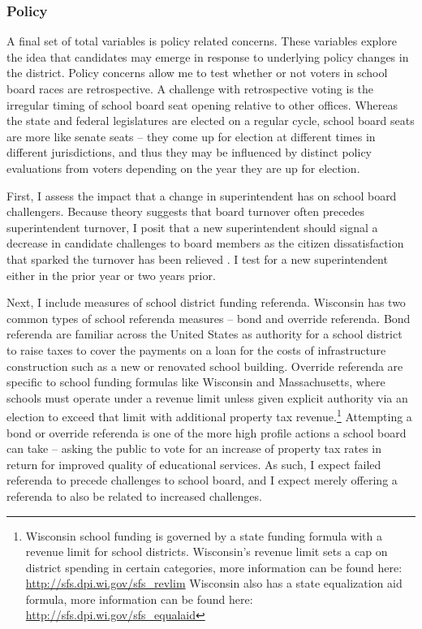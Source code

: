 \subsubsection{Policy}
A final set of total variables is policy related concerns. These variables 
explore the idea that candidates may emerge in response to underlying 
policy changes in the district. Policy concerns allow me to test whether or not 
voters in school board races are retrospective. A challenge with retrospective 
voting is the irregular timing of school board seat opening relative to other 
offices. Whereas the state and federal legislatures are elected on a regular cycle, 
school board seats are more like senate seats -- they come up for election at 
different times in different jurisdictions, and thus they may be influenced by 
distinct policy evaluations from voters depending on the year they are up for election. 

First, I assess the impact that a change in superintendent has on school board 
challengers. Because theory suggests that board turnover often precedes 
superintendent turnover, I posit that a new superintendent should signal a 
decrease in candidate challenges to board members as the citizen dissatisfaction 
that sparked the turnover has been relieved \cite{RefWorks:336, RefWorks:340}. 
I test for a new superintendent either in the prior year or two years prior. 

Next, I include measures of school district funding referenda. Wisconsin has 
two common types of school referenda measures -- bond and override referenda. 
Bond referenda are familiar across the United States as authority for a school 
district to raise taxes to cover the payments on a loan for the costs of infrastructure 
construction such as a new or renovated school building. Override referenda are specific 
to school funding formulas like Wisconsin and Massachusetts, where schools must 
operate under a revenue limit unless given explicit authority via an 
election to exceed that limit with additional property tax revenue.\footnote{Wisconsin 
school funding is governed by a state funding formula with a revenue limit for 
school districts. Wisconsin's revenue limit sets a cap on district spending in 
certain categories, more information can be found here: \url{http://sfs.dpi.wi.gov/sfs_revlim} Wisconsin also has a state equalization aid formula, more information 
can be found here: \url{http://sfs.dpi.wi.gov/sfs_equalaid}} Attempting 
a bond or override referenda is one of the more high profile actions a school 
board can take -- asking the public to vote for an increase of property tax rates 
in return for improved quality of educational services. As such, I expect 
failed referenda to precede challenges to school board, and I expect merely 
offering a referenda to also be related to increased challenges. 

